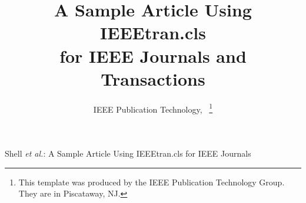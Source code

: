 \documentclass[lettersize,journal]{IEEEtran}
\begin{document}
\title{A Sample Article Using IEEEtran.cls\\ for IEEE Journals and Transactions}

\author{IEEE Publication Technology,~
\thanks{This template was produced by the IEEE Publication Technology Group. They are in Piscataway, NJ.}%
}

%
{Shell \MakeLowercase{\textit{et al.}}: A Sample Article Using IEEEtran.cls for IEEE Journals}


\maketitle








\end{document}
